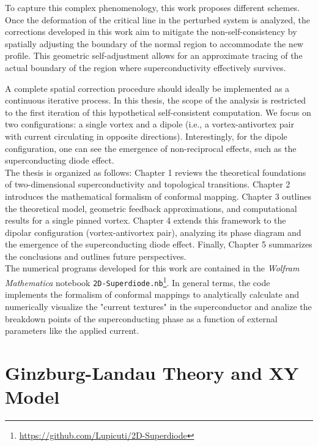 \documentclass[english,binding=0.6cm,noexaminfo]{sapthesis}
\begin{document}
To capture this complex phenomenology, this work 
proposes different schemes. 
 Once the deformation of the critical line in the perturbed system is analyzed, the corrections developed in this work aim to mitigate the non-self-consistency by spatially adjusting the boundary of the normal region to accommodate the new profile. This geometric self-adjustment allows for an approximate tracing of the actual boundary of the region where superconductivity effectively survives.


A complete spatial correction procedure should ideally be implemented as a continuous iterative process. In this thesis, the scope of the analysis is restricted to the first iteration of this hypothetical self-consistent computation. We focus on two configurations: a single vortex and a dipole (i.e., a vortex-antivortex pair with current circulating in opposite directions). Interestingly, for the dipole configuration, one can see the emergence of non-reciprocal effects, such as the superconducting diode effect.\\ 
The thesis is organized as follows: Chapter 1 reviews the theoretical foundations of two-dimensional superconductivity and topological transitions. Chapter 2 introduces the mathematical formalism of conformal mapping. Chapter 3 outlines the theoretical model, geometric feedback approximations, and computational results for a single pinned vortex. Chapter 4 extends this framework to the dipolar configuration (vortex-antivortex pair), analyzing its phase diagram and the emergence of the superconducting diode effect. Finally, Chapter 5 summarizes the conclusions and outlines future perspectives.\\
The numerical programs developed for this work are contained in the \textit{Wolfram Mathematica} notebook \texttt{2D-Superdiode.nb}\footnote{\url{https://github.com/Lupicuti/2D-Superdiode}}. In general terms, the code implements the formalism of conformal mappings to analytically calculate and numerically visualize the "current textures" in the superconductor and analize the breakdown points of the superconducting phase as a function of external parameters like the applied current.
\chapter{Ginzburg-Landau Theory and XY Model}
\label{cap:physicsframework}
\end{document}
